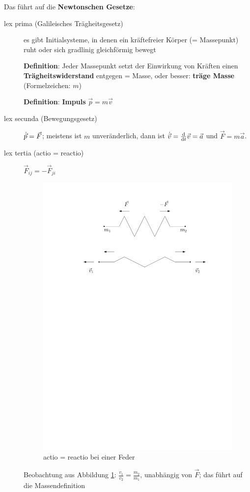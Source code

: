 Das führt auf die \textbf{Newtonschen Gesetze}: 
\begin{description}
	\item[lex prima (Galileisches Trägheitsgesetz)] es gibt Initialsysteme, in denen ein kräftefreier Körper (= Massepunkt) ruht oder sich gradlinig gleichförmig bewegt
		
	\textbf{Definition}: Jeder Massepunkt setzt der Einwirkung von Kräften einen \textbf{Trägheitswiderstand} entgegen = Masse, oder besser: \textbf{träge Masse} (Formelzeichen: $m$)
		
	\textbf{Definition}: \textbf{Impuls} $\vec{p} = m \vec{v}$
		
	\item[lex secunda (Bewegungsgesetz)] $\dot{\vec{p}} = \vec{F}$; meistens ist $m$ unveränderlich, dann ist $\dot{\vec{v}} = \frac{\mathrm{d}}{\mathrm{d}t} \vec{v} = \vec{a}$ und $\vec{F} = m \vec{a}$.
		
	\item[lex tertia (actio = reactio)] $\vec{F}_{ij} = - \vec{F}_{ji}$ 
	
	\begin{figure}
		\centering
		\includegraphics[scale=0.5]{figures/ch1/feder}
		\caption{actio = reactio bei einer Feder}
		\label{fig:ch1_feder}
	\end{figure}

	
	Beobachtung aus Abbildung \ref{fig:ch1_feder}: $\frac{v_1}{v_2} = \frac{m_2}{m_1}$, unabhängig von $\vec{F}$; das führt auf die Massendefinition
\end{description}

